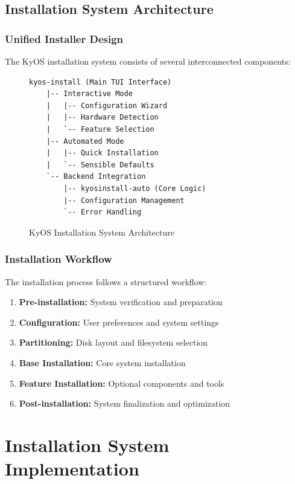 \documentclass[12pt,a4paper]{article}
\begin{document}
\subsection{Installation System Architecture}

\subsubsection{Unified Installer Design}
The KyOS installation system consists of several interconnected components:

\begin{figure}[H]
\centering
\begin{lstlisting}[caption=Installation System Components]
kyos-install (Main TUI Interface)
    |-- Interactive Mode
    |   |-- Configuration Wizard
    |   |-- Hardware Detection
    |   `-- Feature Selection
    |-- Automated Mode
    |   |-- Quick Installation
    |   `-- Sensible Defaults
    `-- Backend Integration
        |-- kyosinstall-auto (Core Logic)
        |-- Configuration Management
        `-- Error Handling
\end{lstlisting}
\caption{KyOS Installation System Architecture}
\end{figure}

\subsubsection{Installation Workflow}
The installation process follows a structured workflow:

\begin{enumerate}
    \item \textbf{Pre-installation:} System verification and preparation
    \item \textbf{Configuration:} User preferences and system settings
    \item \textbf{Partitioning:} Disk layout and filesystem selection
    \item \textbf{Base Installation:} Core system installation
    \item \textbf{Feature Installation:} Optional components and tools
    \item \textbf{Post-installation:} System finalization and optimization
\end{enumerate}

\section{Installation System Implementation}
\end{document}
